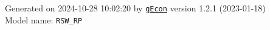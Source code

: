 \documentclass[10pt,a4paper]{article}
\numberwithin{equation}{section}
\begin{document}
\begin{landscape}
\begin{flushleft}{\large
Generated  on 2024-10-28 10:02:20 by \href{http://gecon.r-forge.r-project.org/}{\texttt{gEcon}} version 1.2.1 (2023-01-18)\\
Model name: \verb+RSW_RP+
}\end{flushleft}


\end{landscape}

\end{document}
